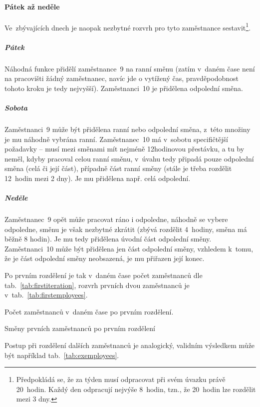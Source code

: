 \documentclass[twoside]{ctuthesis}
\begin{document}
\paragraph{Pátek až neděle} Ve~zbývajících dnech je naopak nezbytné rozvrh pro tyto zaměstnance sestavit\footnote{Předpokládá se, že za týden musí odpracovat při svém úvazku právě 20~hodin. Každý den odpracují nejvýše 8~hodin, tzn., že 20~hodin lze rozdělit mezi 3 dny.}.

\subparagraph{Pátek} Náhodná funkce přidělí zaměstnance~9 na ranní směnu (zatím v~daném čase není na pracovišti žádný zaměstnanec, navíc jde o vytížený čas, pravděpodobnost tohoto kroku je tedy nejvyšší). Zaměstnanci~10 je přidělena odpolední směna.

\subparagraph{Sobota} Zaměstnanci~9 může být přidělena ranní nebo odpolední směna, z~této množiny je mu náhodně vybrána ranní. Zaměstnanec~10 má v~sobotu specifičtější požadavky -- musí mezi směnami mít nejméně 12hodinovou přestávku, a tu by neměl, kdyby pracoval celou ranní směnu, v~úvahu tedy připadá pouze odpolední směna (celá či její část), případně část ranní směny (stále je třeba rozdělit 12~hodin mezi 2 dny). Je mu přidělena např. celá odpolední.

\subparagraph{Neděle} Zaměstnanec~9 opět může pracovat ráno i odpoledne, náhodně se vybere odpoledne, směnu je však nezbytné zkrátit (zbývá rozdělit 4~hodiny, směna má běžně 8 hodin). Je mu tedy přidělena úvodní část odpolední směny. Zaměstnanci~10 může být přidělena jen část odpolední směny, vzhledem k~tomu, že je část odpolední směny neobsazená, je mu přiřazen její konec.

Po prvním rozdělení je tak v~daném čase počet zaměstnanců dle tab.~\ref{tab:firstiteration}, rozvrh prvních dvou zaměstnanců je v~tab.~\ref{tab:firstemployees}.

\begin{table}[h]
	
	\caption{Počet zaměstnanců v~daném čase po prvním rozdělení.}
	\label{tab:firstiteration}

\end{table}

\begin{table}[h]
	
	\caption{Směny prvních zaměstnanců po prvním rozdělení}
	\label{tab:firstemployees}

\end{table}

Postup při rozdělení dalších zaměstnanců je analogický, validním výsledkem může být například tab.~\ref{tab:exemployees}.
\end{document}

